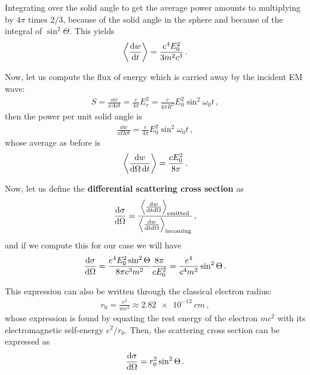 \documentclass[main.tex]{subfiles}
\begin{document}
Integrating over the solid angle to get the average power amounts to multiplying by \(4 \pi \) times \(2/3\), because of the solid angle in the sphere and because of the integral of \(\sin^2 \Theta\). 
This yields 
%
\begin{align}
\expval{\dv{w}{t}} = \frac{e^{4} E_0^2}{3 m^2 c^3}
\,.
\end{align}

Now, let us compute the flux of energy which is carried away by the incident EM wave: 
%
\begin{align}
S = \frac{ \dd{w}}{ \dd{A} \dd{t}} 
= \frac{c}{4 \pi } E_r^2 
= \frac{c}{4 \pi R^2} E_0^2 \sin^2 \omega_0t 
\,,
\end{align}
%
then the power per unit solid angle is 
%
\begin{align}
\frac{ \dd{w}}{ \dd{\Omega } \dd{t}} = \frac{c}{4 \pi } E_0^2 \sin^2 \omega_0 t 
\,,
\end{align}
%
whose average as before is 
%
\begin{align}
\expval{ \frac{ \dd{w}}{ \dd{\Omega } \dd{t}}} = \frac{c E_0^2}{8 \pi }
\,.
\end{align}


Now, let us define the \textbf{differential scattering cross section} as 
%
\begin{align}
\dv{\sigma }{\Omega } = 
\frac{
    \expval{\frac{ \dd{w}}{ \dd{t} \dd{\Omega }}}_{\text{emitted}}
    }{
    \expval{\frac{ \dd{w}}{ \dd{t} \dd{\Omega }}}_{\text{incoming}}
}
\,,
\end{align}
%
and if we compute this for our case we will have 
%
\begin{align}
\dv{\sigma }{\Omega } = \frac{e^{4}E_0^2 \sin^2 \Theta }{8 \pi c^3 m^2}
\frac{8 \pi }{c E_0^2} 
= \frac{e^{4}}{c^{4} m^2} \sin^2 \Theta 
\,.
\end{align}

This expression can also be written through the classical electron radius: 
%
\begin{align}
r_0 = \frac{e^2}{mc^2} \approx \SI{2.82e-13}{cm}
\,,
\end{align}
%
whose expression is found by equating the rest energy of the electron \(m c^2\) with its electromagnetic self-energy \(e^2 / r_0 \). 
Then, the scattering cross section can be expressed as 
%
\begin{align}
\dv{\sigma }{\Omega } = r_0^2 \sin^2 \Theta 
\,.
\end{align}
\end{document}
